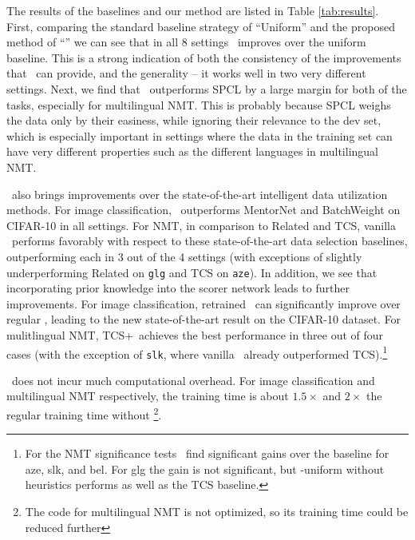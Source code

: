 
The results of the baselines and our method are listed in Table \ref{tab:results}.
First, comparing the standard baseline strategy of ``Uniform'' and the proposed method of ``\dds'' we can see that in all 8 settings \dds~improves over the uniform baseline. This is a strong indication of both the consistency of the improvements that \dds~can provide, and the generality -- it works well in two very different settings. Next, we find that \dds~outperforms SPCL by a large margin for both of the tasks, especially for multilingual NMT. This is probably because SPCL weighs the data only by their easiness, while ignoring their relevance to the dev set, which is especially important in settings where the data in the training set can have very different properties such as the different languages in multilingual NMT. 

\dds~also brings improvements over the state-of-the-art intelligent data utilization methods. For image classification, \dds~outperforms MentorNet and BatchWeight on CIFAR-10 in all settings. For NMT, in comparison to Related and TCS, vanilla \dds~performs favorably with respect to these state-of-the-art data selection baselines, outperforming each in 3 out of the 4 settings (with exceptions of slightly underperforming Related on \texttt{glg} and TCS on \texttt{aze}).
In addition, we see that incorporating prior knowledge into the scorer network leads to further improvements. For image classification, retrained \dds~can significantly improve over regular \dds, leading to the new state-of-the-art result on the CIFAR-10 dataset. For mulitlingual NMT, TCS+\dds~achieves the best performance in three out of four cases (with the exception of \texttt{slk}, where vanilla \dds~already outperformed TCS).\footnote{For the NMT significance tests~\citep{significance_nmt} find significant gains over the baseline for aze, slk, and bel. For glg the gain is not significant, but \dds-uniform without heuristics performs as well as the TCS baseline.}

\dds~does not incur much computational overhead. For image classification and multilingual NMT respectively, the training time is about $1.5\times$ and $2\times$ the regular training time without \dds\footnote{The code for multilingual NMT is not optimized, so its training time could be reduced further}.